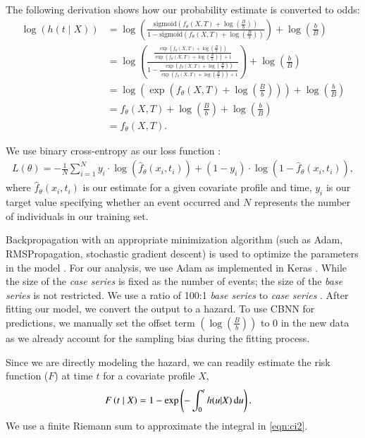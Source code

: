 \documentclass[preprint,12pt]{elsarticle}
\begin{document}
The following derivation shows how our probability estimate is converted
to odds: \begin{align*}
 \log\left( h(t \mid X) \right) &= \log\left(\frac{\mathrm{sigmoid}\left(f_{\theta}(X, T) + \log\left(\frac{B}{b}\right)\right)}{1-\mathrm{sigmoid}\left(f_{\theta}(X, T) + \log\left(\frac{B}{b}\right)\right)}\right) + \log\left(\frac{b}{B}\right) \\
 &= \log\left( \frac{\frac{\exp\left(f_{\theta}(X, T) + \log\left(\frac{B}{b}\right)\right)}{\exp\left(f_{\theta}(X, T) + \log\left(\frac{B}{b}\right)\right)+1}}{1-\frac{\exp\left(f_{\theta}(X, T) + \log\left(\frac{B}{b}\right)\right)}{\exp\left(f_{\theta}(X, T) + \log\left(\frac{B}{b}\right)\right)+1}}\right) + \log\left(\frac{b}{B}\right) \\
 &= \log\left(\exp\left( f_{\theta}(X, T) + \log\left(\frac{B}{b}\right) \right) \right) + \log\left(\frac{b}{B}\right) \\
 &= f_{\theta}(X, T) + \log\left(\frac{B}{b}\right) + \log\left(\frac{b}{B}\right) \\
&= f_{\theta}(X, T). 
\end{align*}

We use binary cross-entropy as our loss function \citep{gulli2017}:
\begin{align*}
L(\theta)=-\frac{1}{N} \sum^{N}_{i=1} y_{i} \cdot \log(\hat{f}_{\theta}(x_{i}, t_{i}) ) + (1-y_{i} )\cdot \log(1-\hat{f}_{\theta}(x_{i}, t_{i}) ),
\end{align*} where \(\hat{f}_{\theta}(x_{i}, t_{i})\) is our estimate
for a given covariate profile and time, \(y_{i}\) is our target value specifying whether an event occurred and \(N\) represents
the number of individuals in our training set.

Backpropagation with an appropriate minimization algorithm (such as Adam, RMSPropagation, stochastic gradient
descent) is used to optimize the parameters in the model \citep{gulli2017}. For our analysis, we use Adam as implemented
in Keras \citep{gulli2017}. While the size of the \emph{case series} is fixed as the number of events; the size of the
\emph{base series} is not restricted. We use a ratio of 100:1 \emph{base series} to \emph{case series} \citep{hanley2009}.
After fitting our model, we
convert the output to a hazard. To use CBNN for predictions, we manually set the offset term $\left(\log\left(\frac{B}{b} \right)\right)$
to 0 in the new data as we already account for the sampling bias during the fitting process.

Since we are directly modeling the hazard, we can readily estimate the
risk function (\(F\)) at time \(t\) for a covariate profile \(X\),
\begin{align}\label{eqn:ci2}
F\left(t\mid X\right)& = 1 - \exp\left(-\int_{0}^{t}h(u|X) \,\textrm du\right).
\end{align} We use a finite Riemann sum \citep{hughes2020calculus} to
approximate the integral in \eqref{eqn:ci2}.
\end{document}
